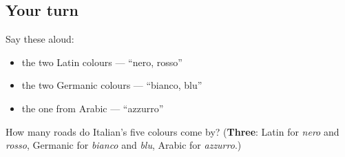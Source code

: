 \subsection*{Your turn}
Say these aloud:

\begin{itemize}
\raggedright
  \item the two Latin colours — \textquotedblleft{}nero, rosso\textquotedblright{}
  \item the two Germanic colours — \textquotedblleft{}bianco, blu\textquotedblright{}
  \item the one from Arabic — \textquotedblleft{}azzurro\textquotedblright{}
\end{itemize}

\begin{tcolorbox}[breakable,colback=teal!4,colframe=teal!35!black,title={Before you move on}]
How many roads do Italian's five colours come by? (\textbf{Three}: Latin for \emph{nero} and \emph{rosso}, Germanic for \emph{bianco} and \emph{blu}, Arabic for \emph{azzurro}.)
\end{tcolorbox}

